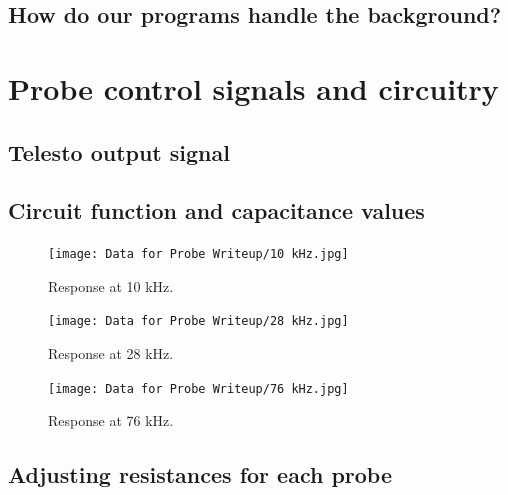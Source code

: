 \documentclass{article}
\begin{document}
\par{}

\subsection{How do our programs handle the background?}

\par{}

\section{Probe control signals and circuitry}

\par{}

\subsection{Telesto output signal}

\par{}

\subsection{Circuit function and capacitance values}

\par{}

\begin{figure}[!h]
	\centering
	\texttt{[image: Data for Probe Writeup/10 kHz.jpg]}
	\caption{Response at 10 kHz.}
\end{figure}

\begin{figure}[!h]
	\centering
	\texttt{[image: Data for Probe Writeup/28 kHz.jpg]}
	\caption{Response at 28 kHz.}
\end{figure}

\begin{figure}[!h]
	\centering
	\texttt{[image: Data for Probe Writeup/76 kHz.jpg]}
	\caption{Response at 76 kHz.}
\end{figure}

\subsection{Adjusting resistances for each probe}

\par{}
\end{document}
